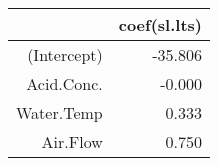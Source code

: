 \begin{table}[ht]
\centering
\begin{tabular}{rr}
  \hline
 & coef(sl.lts) \\ 
  \hline
(Intercept) & -35.806 \\ 
  Acid.Conc. & -0.000 \\ 
  Water.Temp & 0.333 \\ 
  Air.Flow & 0.750 \\ 
   \hline
\end{tabular}
\end{table}
